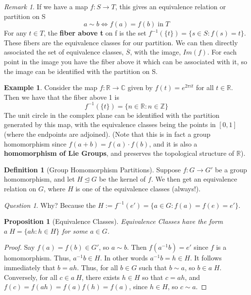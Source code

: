 \documentclass[12pt]{article}
\newtheorem{prop}[thm]{Proposition}
\theoremstyle{definition}
\newtheorem{defn}[thm]{Definition}
\newtheorem{eg}[thm]{Example}
\theoremstyle{remark}
\newtheorem{rmk}[thm]{Remark}
\newtheorem*{qst}{Question}
\numberwithin{equation}{section}
\newcommand\C{\mathbb C}    %
\newcommand\R{\mathbb R}    %
\newcommand\Z{\mathbb Z}    %
\newcommand\B[1]{\textbf{ #1}}
\newcommand\nsub{\trianglelefteq}
\begin{document}
\begin{rmk}
        If we have a map $f:S \rightarrow T$, this gives an equivalence relation or partition on S \begin{equation}
                a \sim b \iff f(a) = f(b)\;\text{in}\;T
        \end{equation}
        For any $t \in T$, the \B{fiber above t} on f is the set $f^{-1}(\{t\}) = \{s \in S: f(s) = t\}$. These fibers are the equivalence classes for our partition. We can then directly associated the set of equivalence classes, $\overline{S}$, with the image, $Im(f)$. For each point in the image you have the fiber above it which can be associated with it, so the image can be identified with the partition on S.
\end{rmk}

\vspace{15pt}

\begin{eg}
        Consider the map $f: \R \rightarrow \C$ given by $f(t) = e^{2\pi it}$ for all $t \in \R$. Then we have that the fiber above 1 is $$f^{-1}(\{t\}) = \{n \in \R: n \in \Z\}$$ The unit circle in the complex plane can be identified with the partition generated by this map, with the equivalence classes being the points in $[0,1]$ (where the endpoints are adjoined). (Note that this is in fact a group homomorphism since $f(a+b)=f(a)\cdot f(b)$, and it is also a \B{homomorphism of Lie Groups}, and preserves the topological structure of $\R$).
\end{eg}


\vspace{15pt}

\begin{defn}[Group Homomorphism Partitions]
        Suppose $f:G \rightarrow G'$ be a group homomorphism, and let $H \nsub G$ be the kernel of $f$. We then get an equivalence relation on $G$, where $H$ is one of the equivalence classes (always!). 
\end{defn}

\begin{qst}
        Why? Because the $H:= f^{-1}(e') = \{a \in G: f(a) = f(e) = e'\}$.
\end{qst}

\vspace{15pt}

\begin{prop}[Equivalence Classes]
        Equivalence Classes have the form $a\;H = \{ah: h \in H\}$ for some $a \in G$.
\end{prop}
\begin{proof}
        Say $f(a) = f(b) \in G'$, so $a \sim b$. Then $f(a^{-1}b) = e'$ since $f$ is a homomorphism. Thus, $a^{-1}b \in H$. In other words $a^{-1}b = h \in H$. It follows immediately that $b = ah$. Thus, for all $b \in G$ such that $b \sim a$, so $b \in a\;H$. Conversely, for all $c \in a\:H$, there exists $h \in H$ so that $c = ah$, and $f(c) = f(ah) =f(a)f(h)= f(a)$, since $h \in H$, so $c \sim a$.
\end{proof}
\end{document}
